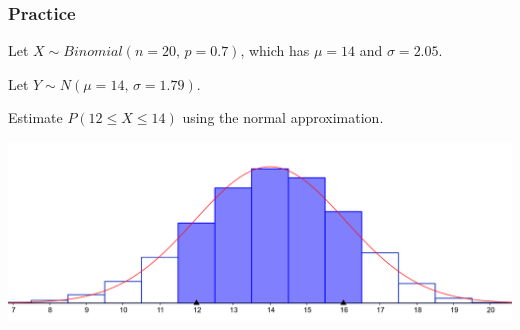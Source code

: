 \begin{frame}
\frametitle{Practice}
Let $X\sim Binomial(n=20,\,p=0.7)$, which has $\mu = 14$ and $\sigma = 2.05$. \pause

Let $Y\sim N(\mu=14,\, \sigma=1.79)$. \pause

Estimate $P(12 \le X \le 14)$ using the normal approximation.
\begin{center}
\includegraphics[scale=0.08]{3-4_binomial_distribution/figures/bin_norm/geogebra-export2.png}
\end{center}
\pause
{}
\pause
{}~~\pause~~
\pause
{}

\end{frame}







